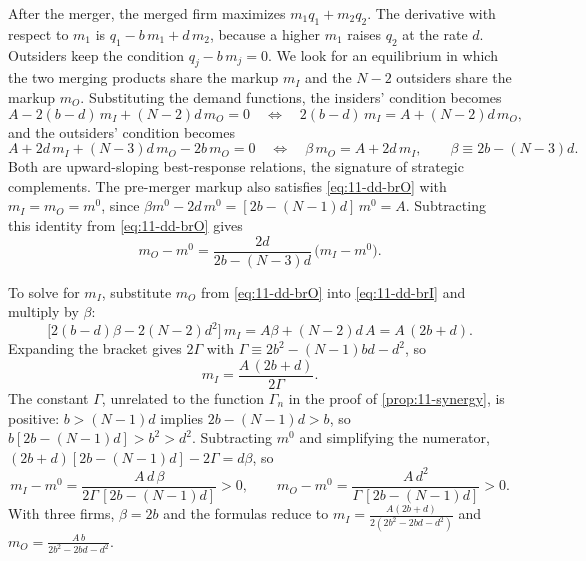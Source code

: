 After the merger, the merged firm maximizes $m_1 q_1 + m_2 q_2$. The derivative with respect to $m_1$ is
$q_1 - b\,m_1 + d\,m_2$, because a higher $m_1$ raises $q_2$ at the rate $d$. Outsiders keep the condition
$q_j - b\,m_j = 0$. We look for an equilibrium in which the two merging products share the markup $m_I$ and the
$N - 2$ outsiders share the markup $m_O$. Substituting the demand functions, the insiders' condition becomes
\begin{equation}\label{eq:11-dd-brI}
  A - 2(b - d)\,m_I + (N-2)d\,m_O = 0
  \quad\Longleftrightarrow\quad
  2(b-d)\,m_I = A + (N-2)d\,m_O ,
\end{equation}
and the outsiders' condition becomes
\begin{equation}\label{eq:11-dd-brO}
  A + 2d\,m_I + (N-3)d\,m_O - 2b\,m_O = 0
  \quad\Longleftrightarrow\quad
  \beta\, m_O = A + 2d\,m_I , \qquad \beta \equiv 2b - (N-3)d .
\end{equation}
Both are upward-sloping best-response relations, the signature of strategic complements. The pre-merger markup
also satisfies \eqref{eq:11-dd-brO} with $m_I = m_O = m^0$, since $\beta m^0 - 2d\,m^0 = [2b - (N-1)d]\,m^0 = A$.
Subtracting this identity from \eqref{eq:11-dd-brO} gives
\begin{equation}\label{eq:11-dd-ratio}
  m_O - m^0 = \frac{2d}{2b - (N-3)d}\,\big(m_I - m^0\big) .
\end{equation}

To solve for $m_I$, substitute $m_O$ from \eqref{eq:11-dd-brO} into \eqref{eq:11-dd-brI} and multiply by $\beta$:
\begin{equation*}
  \big[2(b-d)\beta - 2(N-2)d^2\big]\, m_I = A\beta + (N-2)d\,A = A\,(2b + d) .
\end{equation*}
Expanding the bracket gives $2\Gamma$ with $\Gamma \equiv 2b^2 - (N-1)bd - d^2$, so
\begin{equation*}
  m_I = \frac{A\,(2b + d)}{2\Gamma} .
\end{equation*}
The constant $\Gamma$, unrelated to the function $\Gamma_n$ in the proof of \cref{prop:11-synergy}, is positive: $b > (N-1)d$ implies $2b - (N-1)d > b$, so $b[2b - (N-1)d] > b^2 > d^2$.
Subtracting $m^0$ and simplifying the numerator, $(2b+d)[2b - (N-1)d] - 2\Gamma = d\beta$, so
\begin{equation}\label{eq:11-dd-increase}
  m_I - m^0 = \frac{A\,d\,\beta}{2\Gamma\,[2b - (N-1)d]} > 0 ,
  \qquad
  m_O - m^0 = \frac{A\,d^2}{\Gamma\,[2b - (N-1)d]} > 0 .
\end{equation}
With three firms, $\beta = 2b$ and the formulas reduce to $m_I = \frac{A(2b+d)}{2(2b^2 - 2bd - d^2)}$ and
$m_O = \frac{A\,b}{2b^2 - 2bd - d^2}$.

